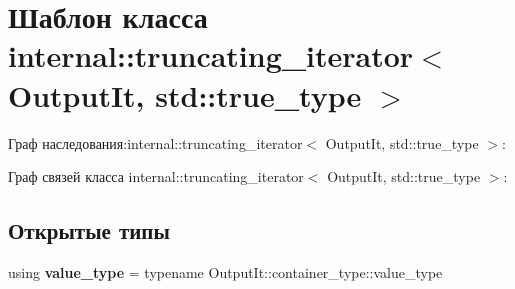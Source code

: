 \hypertarget{classinternal_1_1truncating__iterator_3_01OutputIt_00_01std_1_1true__type_01_4}{}\section{Шаблон класса internal\+:\+:truncating\+\_\+iterator$<$ Output\+It, std\+:\+:true\+\_\+type $>$}
\label{classinternal_1_1truncating__iterator_3_01OutputIt_00_01std_1_1true__type_01_4}


Граф наследования\+:internal\+:\+:truncating\+\_\+iterator$<$ Output\+It, std\+:\+:true\+\_\+type $>$\+:


Граф связей класса internal\+:\+:truncating\+\_\+iterator$<$ Output\+It, std\+:\+:true\+\_\+type $>$\+:
\subsection*{Открытые типы}
\begin{DoxyCompactItemize}
\item 
\mbox{\label{classinternal_1_1truncating__iterator_3_01OutputIt_00_01std_1_1true__type_01_4_a3289d0d219bd965872e4e27dd3740187}} 
using {\bfseries value\+\_\+type} = typename Output\+It\+::container\+\_\+type\+::value\+\_\+type
\end{DoxyCompactItemize}
